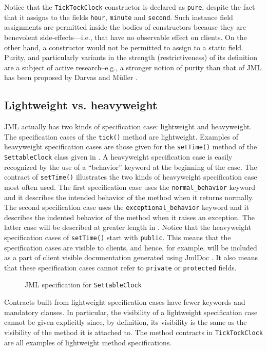 \documentclass{llncs}
\begin{document}
Notice that the \texttt{TickTockClock} constructor is declared as \texttt{pure}, 
despite the fact 
that it assigns to the fields \texttt{hour}, \texttt{minute} and \texttt{second}.
Such instance field assignments are permitted inside the bodies of constructors
because they are benevolent side-effects---i.e., that have no observable effect
on clients.
%
On the other hand, a constructor would not be permitted to assign to a static
field.
%
Purity, and particularly variants in the strength (restrictiveness) of its
definition are a subject of active research--e.g., a stronger notion of purity
than that of JML has been proposed by Darvas and M\"uller
\cite{DarvasMuller05}.

\subsection{Lightweight vs. heavyweight}

JML actually has two kinds of specification case: lightweight and heavyweight.
%
The specification cases of the \texttt{tick()} method are lightweight.
%
%
Examples of heavyweight specification cases are those given for the
\texttt{setTime()} method of the \texttt{SettableClock} class given in
.
%
A heavyweight specification case is easily recognized by the use of a
``behavior'' keyword at the beginning of the case.
%
The contract of \texttt{setTime()} illustrates the two kinds of heavyweight
specification case most often used.
%
The first specification case uses the \texttt{normal\_behavior} keyword and it
describes the intended behavior of the method when it returns normally.
%
%
The second specification case uses the \texttt{exceptional\_behavior} keyword and it
describes the indented behavior of the method when it raises an exception.
%
The latter case will be described at greater length in .
Notice that the heavyweight specification cases of \texttt{setTime()} start
with \texttt{public}.
%
%
This means that the specification cases are visible to clients, and hence, for
example, will be included as a part of client visible documentation generated
using JmlDoc \cite{STTT05}. It also means that these specification cases cannot
refer to \texttt{private} or \texttt{protected} fields.

\begin{figure}[tbp]
%
%
\vspace*{-2ex} %
\caption{JML specification for \texttt{SettableClock}}
\label{Example:SettableClock}
\end{figure}
%
%
Contracts built from lightweight specification cases have fewer keywords and
mandatory clauses.  In particular, the visibility of a lightweight
specification case cannot be given explicitly since, by definition, its
visibility is the same as 
the visibility of the method it is attached to.
%
The method contracts in \texttt{TickTockClock} are all examples of 
lightweight method specifications.
\end{document}
